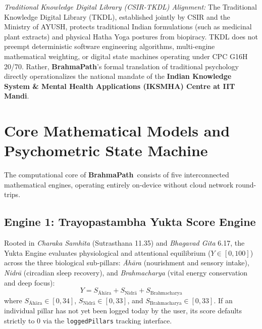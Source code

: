 \documentclass[11pt,a4paper]{article}
\newcommand{\AppName}{\textbf{BrahmaPath}}
\begin{document}
\textit{Traditional Knowledge Digital Library (CSIR-TKDL) Alignment:} The Traditional Knowledge Digital Library (TKDL), established jointly by CSIR and the Ministry of AYUSH, protects traditional Indian formulations (such as medicinal plant extracts) and physical Hatha Yoga postures from biopiracy. TKDL does not preempt deterministic software engineering algorithms, multi-engine mathematical weighting, or digital state machines operating under CPC G16H 20/70. Rather, \AppName's formal translation of traditional psychology directly operationalizes the national mandate of the \textbf{Indian Knowledge System \& Mental Health Applications (IKSMHA) Centre at IIT Mandi}.

\section{Core Mathematical Models and Psychometric State Machine}

The computational core of \AppName\ consists of five interconnected mathematical engines, operating entirely on-device without cloud network round-trips.

\subsection{Engine 1: Trayopastambha Yukta Score Engine}
Rooted in \textit{Charaka Samhita} (Sutrasthana 11.35) and \textit{Bhagavad Gita} 6.17, the Yukta Engine evaluates physiological and attentional equilibrium ($Y \in [0, 100]$) across the three biological sub-pillars: \textit{\=Ah\=ara} (nourishment and sensory intake), \textit{Nidr\=a} (circadian sleep recovery), and \textit{Brahmacharya} (vital energy conservation and deep focus):
\begin{equation}
    Y = S_{\text{\=Ah\=ara}} + S_{\text{Nidr\=a}} + S_{\text{Brahmacharya}}
\end{equation}
where $S_{\text{\=Ah\=ara}} \in [0, 34]$, $S_{\text{Nidr\=a}} \in [0, 33]$, and $S_{\text{Brahmacharya}} \in [0, 33]$. If an individual pillar has not yet been logged today by the user, its score defaults strictly to $0$ via the \texttt{loggedPillars} tracking interface.
\end{document}
